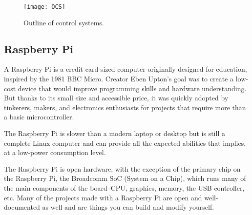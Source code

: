 \begin{figure}[h]		
	\centering
	\texttt{[image: OCS]}
	\caption{Outline of control systems.}
	\label{Fig:Outline}
\end{figure}


\subsection{Raspberry Pi}

A Raspberry Pi is a credit card-sized computer originally designed for education, inspired by the 1981 BBC Micro. Creator Eben Upton's goal was to create a low-cost device that would improve programming skills and hardware understanding. But thanks to its small size and accessible price, it was quickly adopted by tinkerers, makers, and electronics enthusiasts for projects that require more than a basic microcontroller.

The Raspberry Pi is slower than a modern laptop or desktop but is still a complete Linux computer and can provide all the expected abilities that implies, at a low-power consumption level.

The Raspberry Pi is open hardware, with the exception of the primary chip on the Raspberry Pi, the Broadcomm SoC (System on a Chip), which runs many of the main components of the board–CPU, graphics, memory, the USB controller, etc. Many of the projects made with a Raspberry Pi are open and well-documented as well and are things you can build and modify yourself.

